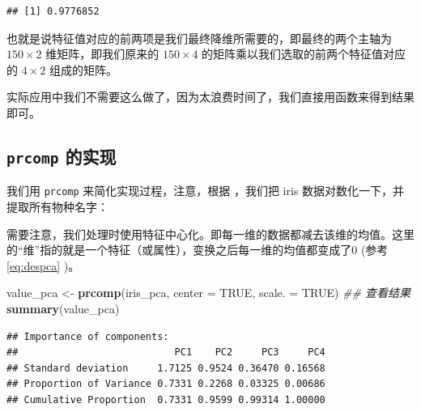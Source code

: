 \documentclass[
]{krantz}
\makeatletter
\newenvironment{Shaded}{\begin{snugshade}}{\end{snugshade}}
\newcommand{\CommentTok}[1]{\textcolor[rgb]{0.56,0.35,0.01}{\textit{#1}}}
\newcommand{\DataTypeTok}[1]{\textcolor[rgb]{0.13,0.29,0.53}{#1}}
\newcommand{\DecValTok}[1]{\textcolor[rgb]{0.00,0.00,0.81}{#1}}
\newcommand{\KeywordTok}[1]{\textcolor[rgb]{0.13,0.29,0.53}{\textbf{#1}}}
\newcommand{\NormalTok}[1]{#1}
\newcommand{\OperatorTok}[1]{\textcolor[rgb]{0.81,0.36,0.00}{\textbf{#1}}}
\newcommand{\OtherTok}[1]{\textcolor[rgb]{0.56,0.35,0.01}{#1}}
\newcommand{\StringTok}[1]{\textcolor[rgb]{0.31,0.60,0.02}{#1}}
\newenvironment{kframe}{%
\medskip{}
\setlength{\fboxsep}{.8em}
 \def\at@end@of@kframe{}%
 \ifinner\ifhmode%
  \def\at@end@of@kframe{\end{minipage}}%
  \begin{minipage}{\columnwidth}%
 \fi\fi%
 \def\FrameCommand##1{\hskip\@totalleftmargin \hskip-\fboxsep
 \colorbox{shadecolor}{##1}\hskip-\fboxsep
     \hskip-\linewidth \hskip-\@totalleftmargin \hskip\columnwidth}%
 \MakeFramed {\advance\hsize-\width
   \@totalleftmargin\z@ \linewidth\hsize
   \@setminipage}}%
 {\par\unskip\endMakeFramed%
 \at@end@of@kframe}
\renewenvironment{Shaded}{\begin{kframe}}{\end{kframe}}
\makeatother
\begin{document}
\begin{verbatim}
## [1] 0.9776852
\end{verbatim}

也就是说特征值对应的前两项是我们最终降维所需要的，即最终的两个主轴为 \(150 \times 2\) 维矩阵，即我们原来的 \(150 \times 4\) 的矩阵乘以我们选取的前两个特征值对应的 \(4 \times 2\) 组成的矩阵。

实际应用中我们不需要这么做了，因为太浪费时间了，我们直接用函数来得到结果即可。

\hypertarget{prcom}{%
\subsection{\texorpdfstring{\texttt{prcomp} 的实现}{prcomp 的实现}}\label{prcom}}

我们用 \texttt{prcomp} 来简化实现过程，注意，根据 \citet{kemp2003modern}，我们把 iris 数据对数化一下，并提取所有物种名字：

\begin{Shaded}
\end{Shaded}

需要注意，我们处理时使用特征中心化。即每一维的数据都减去该维的均值。这里的``维''指的就是一个特征（或属性），变换之后每一维的均值都变成了0 (参考 \eqref{eq:despca} )。

\begin{Shaded}
\begin{Highlighting}[]
\NormalTok{value_pca <-}\StringTok{ }\KeywordTok{prcomp}\NormalTok{(iris_pca, }\DataTypeTok{center =} \OtherTok{TRUE}\NormalTok{, }\DataTypeTok{scale. =} \OtherTok{TRUE}\NormalTok{)}
\CommentTok{## 查看结果}
\KeywordTok{summary}\NormalTok{(value_pca)}
\end{Highlighting}
\end{Shaded}

\begin{verbatim}
## Importance of components:
##                           PC1    PC2     PC3     PC4
## Standard deviation     1.7125 0.9524 0.36470 0.16568
## Proportion of Variance 0.7331 0.2268 0.03325 0.00686
## Cumulative Proportion  0.7331 0.9599 0.99314 1.00000
\end{verbatim}
\end{document}
